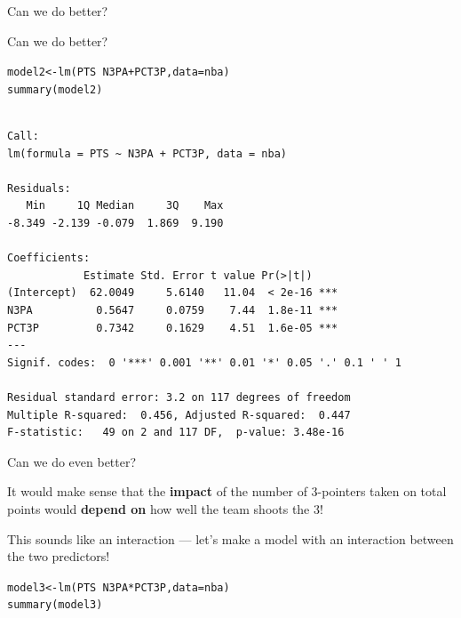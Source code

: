 \documentclass{beamer}\usepackage[]{graphicx}\usepackage[]{color}
\makeatletter
\newcommand{\hlopt}[1]{\textcolor[rgb]{1,0.894,0.769}{#1}}%
\newcommand{\hlstd}[1]{\textcolor[rgb]{1,0.894,0.769}{#1}}%
\newcommand{\hlkwb}[1]{\textcolor[rgb]{0.804,0.776,0.451}{#1}}%
\newcommand{\hlkwc}[1]{\textcolor[rgb]{0.78,0.941,0.545}{#1}}%
\newcommand{\hlkwd}[1]{\textcolor[rgb]{1,0.78,0.769}{#1}}%
\newenvironment{kframe}{%
 \def\at@end@of@kframe{}%
 \ifinner\ifhmode%
  \def\at@end@of@kframe{\end{minipage}}%
  \begin{minipage}{\columnwidth}%
 \fi\fi%
 \def\FrameCommand##1{\hskip\@totalleftmargin \hskip-\fboxsep
 \colorbox{shadecolor}{##1}\hskip-\fboxsep
     \hskip-\linewidth \hskip-\@totalleftmargin \hskip\columnwidth}%
 \MakeFramed {\advance\hsize-\width
   \@totalleftmargin\z@ \linewidth\hsize
   \@setminipage}}%
 {\par\unskip\endMakeFramed%
 \at@end@of@kframe}
\newenvironment{knitrout}{}{} %
\makeatother
\begin{document}
\begin{darkframes}
\begin{frame}{Can we do better?}
    \end{frame}

    \begin{frame}[fragile]{Can we do better?}
      \fontsize{8}{8}\selectfont
\begin{knitrout}
\color{fgcolor}\begin{kframe}
\begin{alltt}
\hlstd{model2} \hlkwb{<-} \hlkwd{lm}\hlstd{(PTS} \hlopt{~} \hlstd{N3PA} \hlopt{+} \hlstd{PCT3P,} \hlkwc{data}\hlstd{=nba)}
\hlkwd{summary}\hlstd{(model2)}
\end{alltt}
\begin{verbatim}

Call:
lm(formula = PTS ~ N3PA + PCT3P, data = nba)

Residuals:
   Min     1Q Median     3Q    Max 
-8.349 -2.139 -0.079  1.869  9.190 

Coefficients:
            Estimate Std. Error t value Pr(>|t|)    
(Intercept)  62.0049     5.6140   11.04  < 2e-16 ***
N3PA          0.5647     0.0759    7.44  1.8e-11 ***
PCT3P         0.7342     0.1629    4.51  1.6e-05 ***
---
Signif. codes:  0 '***' 0.001 '**' 0.01 '*' 0.05 '.' 0.1 ' ' 1

Residual standard error: 3.2 on 117 degrees of freedom
Multiple R-squared:  0.456,	Adjusted R-squared:  0.447 
F-statistic:   49 on 2 and 117 DF,  p-value: 3.48e-16
\end{verbatim}
\end{kframe}
\end{knitrout}

    \end{frame}

    \begin{frame}{Can we do even better?}
      \begin{center}
        It would make sense that the \textbf{impact} of the number of 3-pointers taken on total points would \textbf{depend on} how well the team shoots the 3!

        \pause\bigskip

        This sounds like an interaction --- let's make a model with an interaction between the two predictors!
      \end{center}
    \end{frame}

    \begin{frame}[fragile]
      \fontsize{8}{8}\selectfont
\begin{knitrout}
\color{fgcolor}\begin{kframe}
\begin{alltt}
\hlstd{model3} \hlkwb{<-} \hlkwd{lm}\hlstd{(PTS} \hlopt{~} \hlstd{N3PA} \hlopt{*} \hlstd{PCT3P,} \hlkwc{data}\hlstd{=nba)}
\hlkwd{summary}\hlstd{(model3)}
\end{alltt}
\begin{verbatim}


\end{verbatim}
\end{kframe}
\end{knitrout}
\end{frame}
\end{darkframes}
\end{document}
